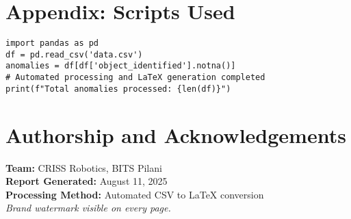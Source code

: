 \documentclass[12pt,a4paper]{report}
\begin{document}
\chapter{Appendix: Scripts Used}
\begin{tcolorbox}[colback=gray!10!white, colframe=gray!80!black, title=Python Processing Script]
\begin{verbatim}
import pandas as pd
df = pd.read_csv('data.csv')
anomalies = df[df['object_identified'].notna()]
# Automated processing and LaTeX generation completed
print(f"Total anomalies processed: {len(df)}")
\end{verbatim}
\end{tcolorbox}

\chapter{Authorship and Acknowledgements}
\noindent\textbf{Team:} CRISS Robotics, BITS Pilani\\
\noindent\textbf{Report Generated:} August 11, 2025\\
\noindent\textbf{Processing Method:} Automated CSV to LaTeX conversion\\

\vspace{0.8cm}
\noindent\textit{Brand watermark visible on every page.}
\end{document}
